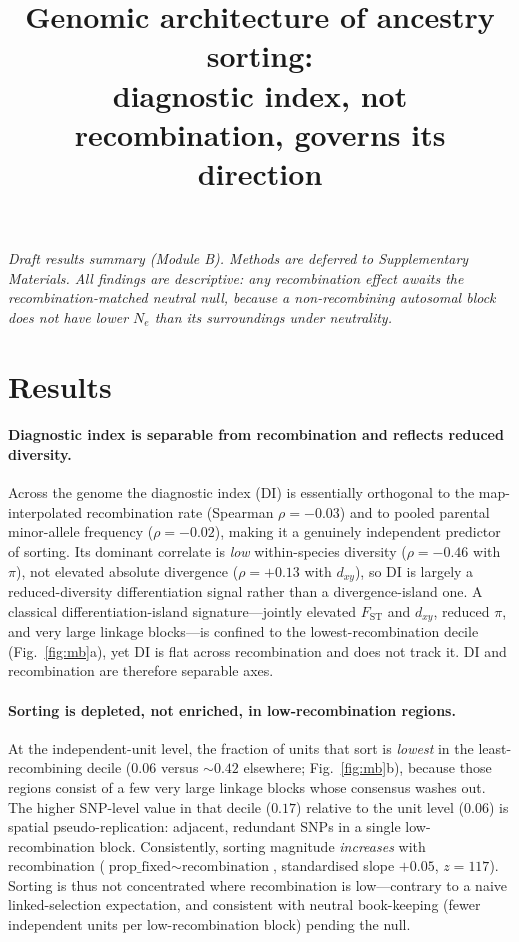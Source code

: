 \documentclass[11pt]{article}
\title{\vspace{-3em}Genomic architecture of ancestry sorting:\\
diagnostic index, not recombination, governs its direction}
\author{}
\date{}
\newcommand{\Fst}{\ensuremath{F_{\mathrm{ST}}}}
\newcommand{\dxy}{\ensuremath{d_{xy}}}
\begin{document}
\maketitle
\vspace{-4em}

\noindent\textit{Draft results summary (Module B). Methods are deferred to
Supplementary Materials. All findings are descriptive: any recombination effect
awaits the recombination-matched neutral null, because a non-recombining
autosomal block does not have lower $N_e$ than its surroundings under
neutrality.}

\section*{Results}

\paragraph{Diagnostic index is separable from recombination and reflects reduced
diversity.}
Across the genome the diagnostic index (DI) is essentially orthogonal to the
map-interpolated recombination rate (Spearman $\rho = -0.03$) and to pooled
parental minor-allele frequency ($\rho = -0.02$), making it a genuinely
independent predictor of sorting. Its dominant correlate is \emph{low}
within-species diversity ($\rho = -0.46$ with $\pi$), not elevated absolute
divergence ($\rho = +0.13$ with \dxy), so DI is largely a reduced-diversity
differentiation signal rather than a divergence-island one. A classical
differentiation-island signature---jointly elevated \Fst{} and \dxy{}, reduced
$\pi$, and very large linkage blocks---is confined to the lowest-recombination
decile (Fig.~\ref{fig:mb}a), yet DI is flat across recombination and does not
track it. DI and recombination are therefore separable axes.

\paragraph{Sorting is depleted, not enriched, in low-recombination regions.}
At the independent-unit level, the fraction of units that sort is
\emph{lowest} in the least-recombining decile ($0.06$ versus $\sim\!0.42$
elsewhere; Fig.~\ref{fig:mb}b), because those regions consist of a few very large
linkage blocks whose consensus washes out. The higher SNP-level value in that
decile ($0.17$) relative to the unit level ($0.06$) is spatial pseudo-replication:
adjacent, redundant SNPs in a single low-recombination block. Consistently,
sorting magnitude \emph{increases} with recombination
($\text{prop\_fixed}\sim\text{recombination}$, standardised slope $+0.05$,
$z=117$). Sorting is thus not concentrated where recombination is low---contrary
to a naive linked-selection expectation, and consistent with neutral
book-keeping (fewer independent units per low-recombination block) pending the
null.
\end{document}
